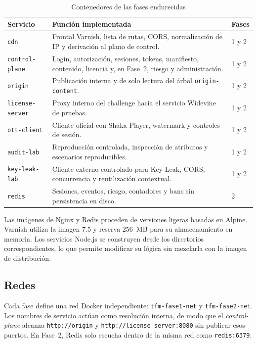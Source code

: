 \begin{table}[H]
\centering
\caption{Contenedores de las fases endurecidas}
\label{tab:contenedores-fases}
\begin{tabularx}{\textwidth}{p{}Yp{0.15\textwidth}}
\toprule
\textbf{Servicio} & \textbf{Función implementada} & \textbf{Fases} \\
\midrule
\nolinkurl{cdn} & Frontal Varnish, lista de rutas, CORS, normalización de IP y derivación al plano de control. & 1 y 2 \\
\nolinkurl{control-plane} & Login, autorización, sesiones, tokens, manifiesto, contenido, licencia y, en Fase~2, riesgo y administración. & 1 y 2 \\
\nolinkurl{origin} & Publicación interna y de solo lectura del árbol \nolinkurl{origin-content}. & 1 y 2 \\
\nolinkurl{license-server} & Proxy interno del challenge hacia el servicio Widevine de pruebas. & 1 y 2 \\
\nolinkurl{ott-client} & Cliente oficial con Shaka Player, watermark y controles de sesión. & 1 y 2 \\
\nolinkurl{audit-lab} & Reproducción controlada, inspección de atributos y escenarios reproducibles. & 1 y 2 \\
\nolinkurl{key-leak-lab} & Cliente externo controlado para Key Leak, CORS, concurrencia y reutilización contextual. & 1 y 2 \\
\nolinkurl{redis} & Sesiones, eventos, riesgo, contadores y bans sin persistencia en disco. & 2 \\
\bottomrule
\end{tabularx}
\end{table}

Las imágenes de Nginx y Redis proceden de versiones ligeras basadas en Alpine. Varnish utiliza la imagen 7.5 y reserva 256~MB para su almacenamiento en memoria. Los servicios Node.js se construyen desde los directorios correspondientes, lo que permite modificar su lógica sin mezclarla con la imagen de distribución.

\subsection{Redes}

Cada fase define una red Docker independiente: \nolinkurl{tfm-fase1-net} y \nolinkurl{tfm-fase2-net}. Los nombres de servicio actúan como resolución interna, de modo que el \textit{control-plane} alcanza \nolinkurl{http://origin} y \nolinkurl{http://license-server:8080} sin publicar esos puertos. En Fase~2, Redis solo escucha dentro de la misma red como \nolinkurl{redis:6379}.

